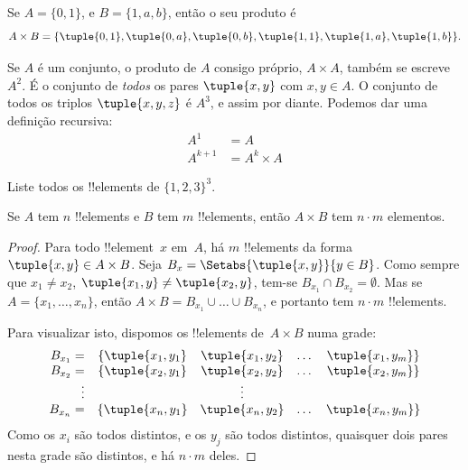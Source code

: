 \documentclass[../../../include/open-logic-section]{subfiles}
\begin{document}
\begin{ex}
Se $A = \{0, 1\}$, e $B = \{1, a, b\}$, então o seu produto é
\[
A \times B = \{ \tuple{0, 1}, \tuple{0, a}, \tuple{0, b},
    \tuple{1, 1}, \tuple{1, a}, \tuple{1, b} \}.
\]
\end{ex}

\begin{ex}
Se $A$ é um conjunto, o produto de $A$ consigo próprio, $A \times A$, também se
escreve~$A^2$. É o conjunto de \emph{todos} os pares $\tuple{x, y}$ com
$x, y \in A$. O conjunto de todos os triplos $\tuple{x, y, z}$ é $A^3$, e
assim por diante. Podemos dar uma definição recursiva:
\begin{align*}
  A^1 & = A\\
  A^{k+1} & = A^k \times A
\end{align*}
\end{ex}

\begin{prob}
Liste todos os !!{element}s de $\{1, 2, 3\}^3$.
\end{prob}

\begin{prop}
Se $A$ tem $n$ !!{element}s e $B$ tem $m$ !!{element}s, então $A
\times B$ tem $n\cdot m$ elementos.
\end{prop}

\begin{proof}
Para todo !!{element}~$x$ em~$A$, há $m$ !!{element}s da
forma $\tuple{x, y} \in A \times B$. Seja $B_x = \Setabs{\tuple{x, y}}{y
  \in B}$. Como sempre que $x_1 \neq x_2$, $\tuple{x_1, y} \neq
\tuple{x_2, y}$, tem-se $B_{x_1} \cap B_{x_2} = \emptyset$. Mas se $A = \{x_1,
\dots, x_n\}$, então $A \times B = B_{x_1} \cup \dots \cup B_{x_n}$, e portanto tem
$n\cdot m$ !!{element}s.

Para visualizar isto, dispomos os !!{element}s de~$A \times B$ numa grade:
\[
\begin{array}{rcccc}
  B_{x_1} = & \{\tuple{x_1, y_1} & \tuple{x_1, y_2} & \dots & \tuple{x_1, y_m}\}\\
  B_{x_2} = & \{\tuple{x_2, y_1} & \tuple{x_2, y_2} & \dots & \tuple{x_2, y_m}\}\\
  \vdots & & \vdots\\
  B_{x_n} = & \{\tuple{x_n, y_1} & \tuple{x_n, y_2} & \dots & \tuple{x_n, y_m}\}
\end{array}
\]
Como os $x_i$ são todos distintos, e os $y_j$ são todos distintos, quaisquer
dois pares nesta grade são distintos, e há $n\cdot m$
deles.
\end{proof}
\end{document}
